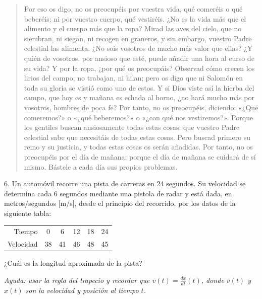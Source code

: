\documentclass[12pt]{article}
\begin{document}
\begin{quote}
Por eso os digo, no os preocupéis por vuestra vida, qué comeréis o qué beberéis;
ni por vuestro cuerpo, qué vestiréis. ¿No es la vida más que el alimento y el
cuerpo más que la ropa? Mirad las aves del cielo, que no siembran, ni siegan,
ni recogen en graneros, y sin embargo, vuestro Padre celestial las alimenta. ¿No
sois vosotros de mucho más valor que ellas? ¿Y quién de vosotros, por ansioso
que esté, puede añadir una hora al curso de su vida? Y por la ropa,
¿por qué os preocupáis? Observad cómo crecen los lirios del campo; no trabajan,
ni hilan; pero os digo que ni Salomón en toda su gloria se vistió como uno de
estos. Y si Dios viste así la hierba del campo, que hoy es y mañana es echada
al horno, ¿no hará mucho más por vosotros, hombres de poca fe? Por tanto, no
os preocupéis, diciendo: «¿Qué comeremos?» o «¿qué beberemos?» o «¿con qué nos
vestiremos?». Porque los gentiles buscan ansiosamente todas estas cosas; que
vuestro Padre celestial sabe que necesitáis de todas estas cosas. Pero
buscad primero su reino y su justicia, y todas estas cosas os serán
añadidas. Por tanto, no os preocupéis por el día de mañana; porque el día
de mañana se cuidará de sí mismo. Bástele a cada día sus propios
problemas.
\end{quote}

\pagebreak 

\begin{myframe}
6. Un automóvil recorre una pista de carreras en 24 segundos. Su velocidad se determina cada 6 segundos mediante una pistola de radar y está dada, en metros/segundos [m/s], desde el principio del recorrido, por los datos de la siguiente tabla:

\begin{center}
\begin{tabular}{||l||c|c|c|c|c||}
\hline\hline
\multicolumn{1}{||r||}{Tiempo} & 0 & 6 & 12 & 18 & 24 \\
\multicolumn{1}{||r||}{Velocidad} & 38 & 41 & 46 & 48 & 45 \\
\hline\hline
\end{tabular}
\end{center}

¿Cuál es la longitud aproximada de la pista?

\textit{Ayuda: usar la regla del trapecio y recordar que $v(t) = \frac{dx}{dt}(t)$, donde $v(t)$ y $x(t)$ son la velocidad y posición al tiempo $t$.}

\end{myframe}
\end{document}

